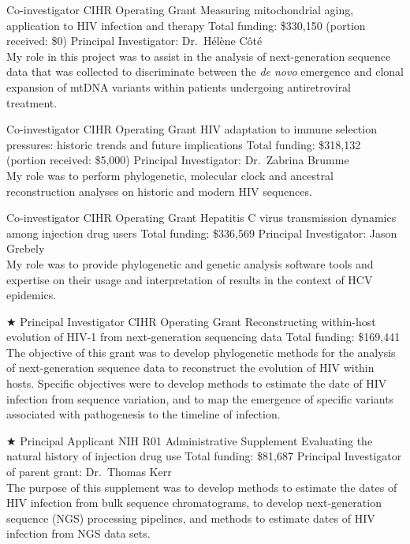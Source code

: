 {Co-investigator}
{CIHR Operating Grant}
{Measuring mitochondrial aging, application to HIV infection and therapy}
{Total funding: \$330,150 (portion received: \$0)}
{
Principal Investigator: Dr.~H\'el\`ene C\^ot\'e\\
My role in this project was to assist in the analysis of next-generation sequence data that was collected to discriminate between the \textit{de novo} emergence and clonal expansion of mtDNA variants within patients undergoing antiretroviral treatment.\\
}

{Co-investigator}
{CIHR Operating Grant}
{HIV adaptation to immune selection pressures: historic trends and future implications}
{Total funding: \$318,132 (portion received: \$5,000)}
{
Principal Investigator: Dr.~Zabrina Brumme\\
My role was to perform phylogenetic, molecular clock and ancestral reconstruction analyses on historic and modern HIV sequences.\\
}

{Co-investigator}
{CIHR Operating Grant}
{Hepatitis C virus transmission dynamics among injection drug users}
{Total funding: \$336,569}
{
Principal Investigator: Jason Grebely\\
My role was to provide phylogenetic and genetic analysis software tools and expertise on their usage and interpretation of results in the context of HCV epidemics.\\
}

{$\bigstar$ Principal Investigator}
{CIHR Operating Grant}
{Reconstructing within-host evolution of HIV-1 from next-generation sequencing data}
{Total funding: \$169,441}
{
The objective of this grant was to develop phylogenetic methods for the analysis of next-generation sequence data to reconstruct the evolution of HIV within hosts.
Specific objectives were to develop methods to estimate the date of HIV infection from sequence variation, and to map the emergence of specific variants associated with pathogenesis to the timeline of infection.\\
}


{$\bigstar$ Principal Applicant}
{NIH R01 Administrative Supplement}
{Evaluating the natural history of injection drug use}
{Total funding: \$81,687}
{
Principal Investigator of parent grant: Dr.~Thomas Kerr\\
The purpose of this supplement was to develop methods to estimate the dates of HIV infection from bulk sequence chromatograms, to develop next-generation sequence (NGS) processing pipelines, and methods to estimate dates of HIV infection from NGS data sets.\\
}



